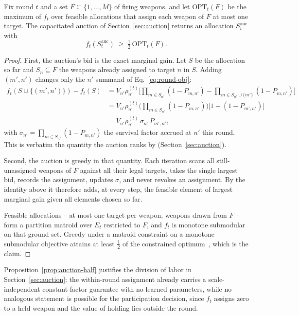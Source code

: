 \begin{proposition}
\label{prop:auction-half}
Fix round $t$ and a set $F \subseteq \{1,\ldots,M\}$ of firing weapons, and let $\text{OPT}_t(F)$ be the maximum of $f_t$ over feasible allocations that assign each weapon of $F$ at most one target. The capacitated auction of Section~\ref{sec:auction} returns an allocation $S^{\text{auc}}_t$ with
\begin{equation}
f_t(S^{\text{auc}}_t) \;\geq\; \tfrac12\,\text{OPT}_t(F).
\end{equation}
\end{proposition}
\begin{proof}
First, the auction's bid is the exact marginal gain. Let $S$ be the allocation so far and $S_n \subseteq F$ the weapons already assigned to target $n$ in $S$. Adding $(m',n')$ changes only the $n'$ summand of Eq.~\eqref{eq:round-obj}:
\begin{align*}
f_t(S \cup \{(m',n')\}) - f_t(S)
&= V_{n'}\rho_{n'}^{(t)}\Big[\textstyle\prod_{m \in S_{n'}}(1-P_{m,n'}) - \prod_{m \in S_{n'} \cup \{m'\}}(1-P_{m,n'})\Big] \\
&= V_{n'}\rho_{n'}^{(t)} \Big(\textstyle\prod_{m \in S_{n'}}(1-P_{m,n'})\Big)\big[1-(1-P_{m',n'})\big] \\
&= V_{n'}\rho_{n'}^{(t)}\,\sigma_{n'}\,P_{m',n'},
\end{align*}
with $\sigma_{n'} = \prod_{m \in S_{n'}}(1-P_{m,n'})$ the survival factor accrued at $n'$ this round. This is verbatim the quantity the auction ranks by (Section~\ref{sec:auction}).

Second, the auction is greedy in that quantity. Each iteration scans all still-unassigned weapons of $F$ against all their legal targets, takes the single largest bid, records the assignment, updates $\sigma$, and never revokes an assignment. By the identity above it therefore adds, at every step, the feasible element of largest marginal gain given all elements chosen so far.

Feasible allocations -- at most one target per weapon, weapons drawn from $F$ -- form a partition matroid over $E_t$ restricted to $F$, and $f_t$ is monotone submodular on that ground set. Greedy under a matroid constraint on a monotone submodular objective attains at least $\tfrac12$ of the constrained optimum~\cite{fisher1978analysis}, which is the claim.
\end{proof}

Proposition~\ref{prop:auction-half} justifies the division of labor in Section~\ref{sec:auction}: the within-round assignment already carries a scale-independent constant-factor guarantee with no learned parameters, while no analogous statement is possible for the participation decision, since $f_t$ assigns zero to a held weapon and the value of holding lies outside the round.

